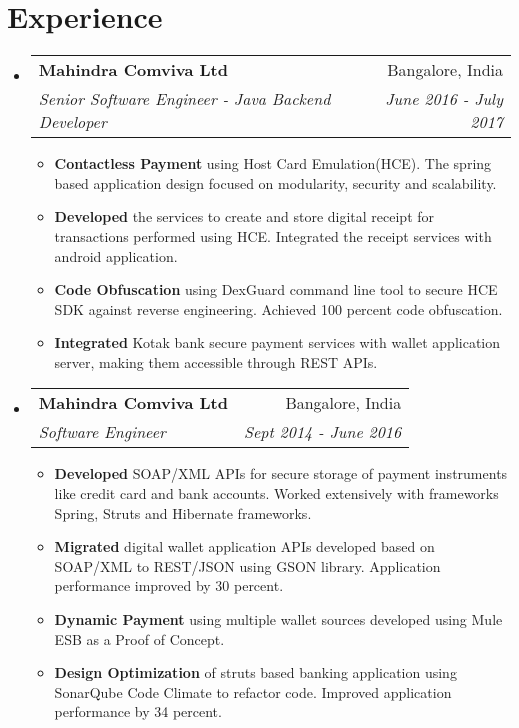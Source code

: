 \documentclass[letterpaper,11pt]{article}
\makeatletter
\newcommand{\resumeItemPlain}[2]{
  \item\small{
    \textbf{#1}{ #2 \vspace{-2pt}}
  }
}
\newcommand{\resumeSubheading}[4]{
  \vspace{-1pt}\item
    \begin{tabular*}{0.97\textwidth}{l@{\extracolsep{\fill}}r}
      \textbf{#1} & #2 \\
      \textit{\small#3} & \textit{\small #4} \\
    \end{tabular*}\vspace{-5pt}
}
\newcommand{\resumeSubHeadingListStart}{\begin{itemize}[leftmargin=*]}
\newcommand{\resumeSubHeadingListEnd}{\end{itemize}}
\newcommand{\resumeItemListStart}{\begin{itemize}}
\newcommand{\resumeItemListEnd}{\end{itemize}\vspace{-5pt}}
\makeatother
\begin{document}
\section{Experience}
  \resumeSubHeadingListStart

    \resumeSubheading
      {Mahindra Comviva Ltd}{Bangalore, India}
      {Senior Software Engineer - Java Backend Developer}{June 2016 - July 2017}
      \resumeItemListStart
        \resumeItemPlain {Contactless Payment}
          {using Host Card Emulation(HCE). The spring based application design focused on modularity, security and scalability.}
        \resumeItemPlain{Developed}
          {the services to create and store digital receipt for transactions performed using HCE. Integrated the receipt services with android application.}
        \resumeItemPlain{Code Obfuscation}
          {using DexGuard command line tool to secure HCE SDK against reverse engineering. Achieved 100 percent code obfuscation.}
        \resumeItemPlain{Integrated}
          {Kotak bank secure payment services with wallet application server, making them accessible through REST APIs. }  
      \resumeItemListEnd
      
    \resumeSubheading
      {Mahindra Comviva Ltd}{Bangalore, India}
      {Software Engineer}{Sept 2014 - June 2016}
      \resumeItemListStart
        \resumeItemPlain{Developed}
          {SOAP/XML APIs for secure storage of payment instruments like credit card and bank accounts. Worked extensively with frameworks Spring, Struts and Hibernate frameworks.}
        \resumeItemPlain{Migrated}
          {digital wallet application APIs developed based on SOAP/XML to REST/JSON using GSON library. Application performance improved by 30 percent.}
        \resumeItemPlain{Dynamic Payment}
          {using multiple wallet sources developed using Mule ESB as a Proof of Concept.}
        \resumeItemPlain{Design Optimization}
          {of struts based banking application using SonarQube Code Climate to refactor code. Improved application performance by 34 percent.}
        
      \resumeItemListEnd

  \resumeSubHeadingListEnd


\end{document}
